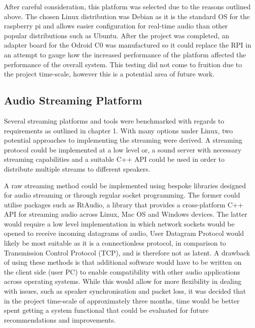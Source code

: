 \documentclass[main.tex]{subfiles}
\begin{document}
\medskip
After careful consideration, this platform was selected due to the reasons outlined above. 
The chosen Linux distribution was Debian as it is the standard OS for the raspberry pi and allows easier configuration for real-time audio than other popular distributions such as Ubuntu. 
After the project was completed, an adapter board for the Odroid C0 was manufactured so it could replace the RPI in an attempt to gauge how the increased performance of the platform affected the performance of the overall system.
This testing did not come to fruition due to the project time-scale, however this is a potential area of future work. 

\subsection{Audio Streaming Platform}
Several streaming platforms and tools were benchmarked with regards to requirements as outlined in chapter 1. 
With many options under Linux, two potential approaches to implementing the streaming were derived. 
A streaming protocol could be implemented at a low level or, a sound server with necessary streaming capabilities and a suitable C++ API could be used in order to distribute multiple streams to different speakers.

\medskip
A raw streaming method could be implemented using bespoke libraries designed for audio streaming or through regular socket programming.
The former could utilise packages such as RtAudio, a library that provides a cross-platform C++ API for streaming audio across Linux, Mac OS and Windows devices.
The latter would require a low level implementation in which network sockets would be opened to receive incoming datagrams of audio, User Datagram Protocol would likely be most suitable as it is a connectionless protocol, in comparison to Transmission Control Protocol (TCP), and is therefore not as latent.
A drawback of using these methods is that additional software would have to be written on the client side (user PC) to enable compatibility with other audio applications across operating systems. 
While this would allow for more flexibility in dealing with issues, such as speaker synchronisation and packet loss, it was decided that in the project time-scale of approximately three months, time would be better spent getting a system functional that could be evaluated for future recommendations and improvements.
\end{document}
